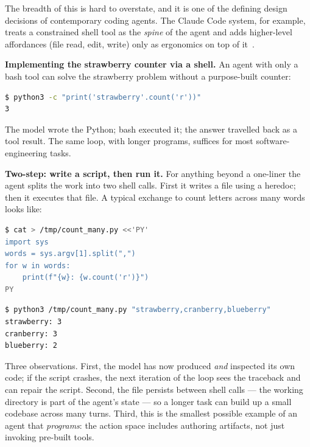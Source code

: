 The breadth of this is hard to overstate, and it is one of the
defining design decisions of contemporary coding agents. The Claude
Code system, for example, treats a constrained shell tool as the
\emph{spine} of the agent and adds higher-level affordances (file
read, edit, write) only as ergonomics on top of it~\citep{liu2026claudecode}.

\begin{examplebox}
\small
\textbf{Implementing the strawberry counter via a shell.} An agent
with only a bash tool can solve the strawberry problem without a
purpose-built counter:

\begin{lstlisting}[language=bash]
$ python3 -c "print('strawberry'.count('r'))"
3
\end{lstlisting}

\noindent
The model wrote the Python; bash executed it; the answer travelled
back as a tool result. The same loop, with longer programs, suffices
for most software-engineering tasks.
\end{examplebox}

\begin{examplebox}
\small
\textbf{Two-step: write a script, then run it.} For anything beyond
a one-liner the agent splits the work into two shell calls. First it
writes a file using a heredoc; then it executes that file. A typical
exchange to count letters across many words looks like:

\begin{lstlisting}[language=bash,caption={First shell call --- create a script file.}]
$ cat > /tmp/count_many.py <<'PY'
import sys
words = sys.argv[1].split(",")
for w in words:
    print(f"{w}: {w.count('r')}")
PY
\end{lstlisting}

\begin{lstlisting}[language=bash,caption={Second shell call --- execute the script.}]
$ python3 /tmp/count_many.py "strawberry,cranberry,blueberry"
strawberry: 3
cranberry: 3
blueberry: 2
\end{lstlisting}

\noindent
Three observations. First, the model has now produced \emph{and}
inspected its own code; if the script crashes, the next iteration of
the loop sees the traceback and can repair the script. Second, the
file persists between shell calls --- the working directory is part
of the agent's state --- so a longer task can build up a small
codebase across many turns. Third, this is the smallest possible
example of an agent that \emph{programs}: the action space includes
authoring artifacts, not just invoking pre-built tools.
\end{examplebox}

